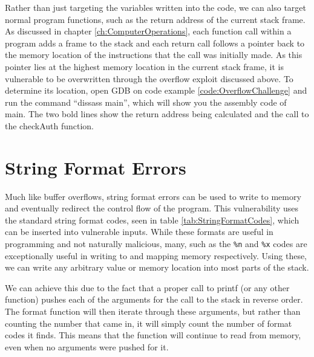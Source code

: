 			Rather than just targeting the variables written into the code, we can also target normal program functions,
			such as the return address of the current stack frame.
			As discussed in chapter \ref{ch:ComputerOperations},
			each function call within a program adds a frame to the stack and each return call follows a pointer back to the memory location of the instructions that the call was initially made.
			As this pointer lies at the highest memory location in the current stack frame, it is vulnerable to be overwritten through the overflow exploit discussed above.
			To determine its location, open GDB on code example \ref{code:OverflowChallenge} and run the command ``dissass main'', which will show you the assembly code of main.
		The two bold lines show the return address being calculated and the call to the checkAuth function. %

	\section{String Format Errors}
		Much like buffer overflows, string format errors can be used to write to memory and eventually redirect the control flow of the program.
		This vulnerability uses the standard string format codes, seen in table \ref{tab:StringFormatCodes}, which can be inserted into vulnerable inputs.
		While these formats are useful in programming and not naturally malicious, many, such as the \verb+%n+ and \verb+%x+ codes are exceptionally useful in writing to and mapping memory respectively.
		Using these, we can write any arbitrary value or memory location into most parts of the stack.

		We can achieve this due to the fact that a proper call to printf (or any other function) pushes each of the arguments for the call to the stack in reverse order.
		The format function will then iterate through these arguments, but rather than counting the number that came in, it will simply count the number of format codes it finds.
		This means that the function will continue to read from memory, even when no arguments were pushed for it.
